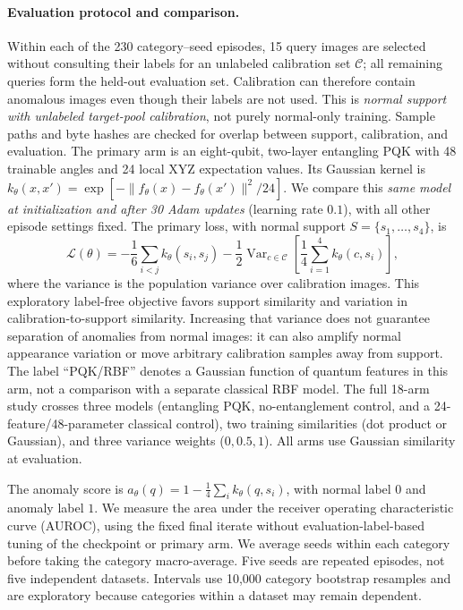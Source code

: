 \paragraph{Evaluation protocol and comparison.}
Within each of the 230 category--seed episodes, 15 query images are
selected without consulting their labels for an unlabeled calibration
set $\mathcal C$; all remaining queries form the held-out evaluation
set. Calibration can therefore contain anomalous images even though
their labels are not used. This is \emph{normal support with unlabeled
target-pool calibration}, not purely normal-only training.
Sample paths and byte hashes are checked for overlap between
support, calibration, and evaluation. The primary arm is an
eight-qubit, two-layer entangling PQK with 48 trainable angles and
24 local XYZ expectation values. Its Gaussian kernel is
$k_\theta(x,x')=\exp[-\|f_\theta(x)-f_\theta(x')\|^2/24]$.
We compare this \emph{same model at initialization and after 30 Adam
updates} (learning rate $0.1$), with all other episode settings fixed.
The primary loss, with normal support $S=\{s_1,\ldots,s_4\}$, is
\begin{equation}
 \mathcal L(\theta)
 =-\frac{1}{6}\sum_{i<j}k_\theta(s_i,s_j)
 -\frac{1}{2}\operatorname{Var}_{c\in\mathcal C}
   \left[\frac{1}{4}\sum_{i=1}^{4}k_\theta(c,s_i)\right],
 \label{eq:visionloss}
\end{equation}
where the variance is the population variance over calibration images.
This exploratory label-free objective favors support similarity and
variation in calibration-to-support similarity. Increasing that
variance does not guarantee separation of anomalies from normal
images: it can also amplify normal appearance variation or move
arbitrary calibration samples away from support.
The label ``PQK/RBF'' denotes a
Gaussian function of quantum features in this arm, not a comparison
with a separate classical RBF model. The full 18-arm study crosses
three models (entangling PQK, no-entanglement control, and a
24-feature/48-parameter classical control), two training similarities
(dot product or Gaussian), and three variance weights
($0,0.5,1$). All arms use Gaussian similarity at evaluation.

The anomaly score is $a_\theta(q)=1-\frac14\sum_i k_\theta(q,s_i)$,
with normal label $0$ and anomaly label $1$. We measure the area
under the receiver operating characteristic curve (AUROC), using the
fixed final iterate without evaluation-label-based tuning of the
checkpoint or primary arm. We average seeds within each category
before taking the category macro-average. Five seeds are repeated
episodes, not five independent datasets. Intervals use 10,000 category
bootstrap resamples and are exploratory because categories within a
dataset may remain dependent.

